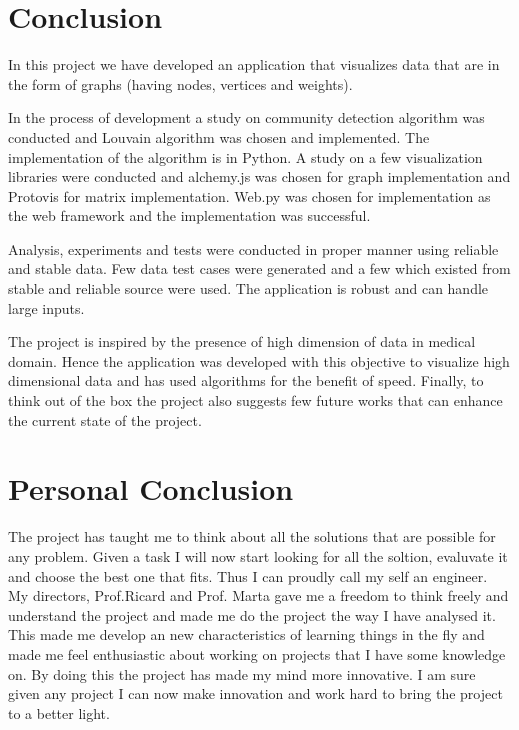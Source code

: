 \section{Conclusion}
In this project we have developed an application that visualizes data that are in the form of graphs (having nodes, vertices and weights). 
\par In the process of development a study on community detection algorithm was conducted and Louvain algorithm was chosen and implemented. The implementation of the algorithm is in Python. A study on a few visualization libraries were conducted and alchemy.js was chosen for graph implementation and Protovis for matrix implementation.  Web.py was chosen for implementation as the web framework and the implementation was successful.
\par Analysis, experiments and tests were conducted in proper manner using reliable and stable data. Few data test cases were generated and a few which existed from stable and reliable source were used. The application is robust and can handle large inputs.
\par The project is inspired by the presence of high dimension of data in medical domain. Hence the application was developed with this objective to visualize high dimensional data and has used algorithms for the benefit of speed. Finally, to think out of the box the project also suggests few future works that can enhance the current state of the project.

\section{Personal Conclusion}
The project has taught me to think about all the solutions that are possible for any problem. Given a task I will now start looking for all the soltion, evaluvate it and choose the best one that fits. Thus I can proudly call my self an engineer. My directors, Prof.Ricard and Prof. Marta gave me a freedom to think freely and understand the project and made me do the project the way I have analysed it.  This made me develop an new characteristics of learning things in the fly and made me feel enthusiastic about working on projects that I have some knowledge on. By doing this the project has made my mind more innovative. I am sure given any project I can now make innovation and work hard to bring the project to a better light.


{}




